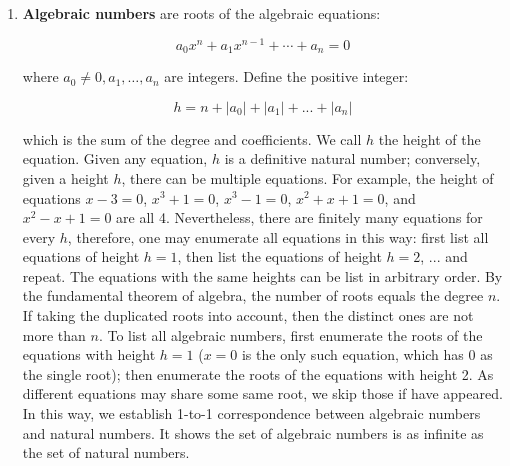 \documentclass[b5paper]{article}
\begin{document}
\begin{enumerate}[(1)]
This shows the set of natural numbers is as infinite as the set of rational numbers.

\item \textbf{Algebraic numbers} are roots of the algebraic equations:

\[
a_0 x^n + a_1 x^{n-1} + \dotsb + a_n = 0
\]

where $a_0 \ne 0, a_1, \dotsc, a_n$ are integers. Define the positive integer:

\[
h = n + |a_0| + |a_1| + ... + |a_n|
\]

which is the sum of the degree and coefficients. We call $h$ the height of the equation. Given any equation, $h$ is a definitive natural number; conversely, given a height $h$, there can be multiple equations. For example, the height of equations $x - 3 = 0$, $x^3 + 1 = 0$, $x^3 - 1 = 0$, $x^2 + x + 1 = 0$, and $x^2 - x + 1 = 0$ are all 4. Nevertheless, there are finitely many equations for every $h$, therefore, one may enumerate all equations in this way: first list all equations of height $h=1$, then list the equations of height $h=2$, ... and repeat. The equations with the same heights can be list in arbitrary order. By the fundamental theorem of algebra, the number of roots equals the degree $n$. If taking the duplicated roots into account, then the distinct ones are not more than $n$. To list all algebraic numbers, first enumerate the roots of the equations with height $h=1$ ($x = 0$ is the only such equation, which has 0 as the single root); then enumerate the roots of the equations with height 2. As different equations may share some same root, we skip those if have appeared. In this way, we establish 1-to-1 correspondence between algebraic numbers and natural numbers. It shows the set of algebraic numbers is as infinite as the set of natural numbers.
\end{enumerate}
\end{document}
